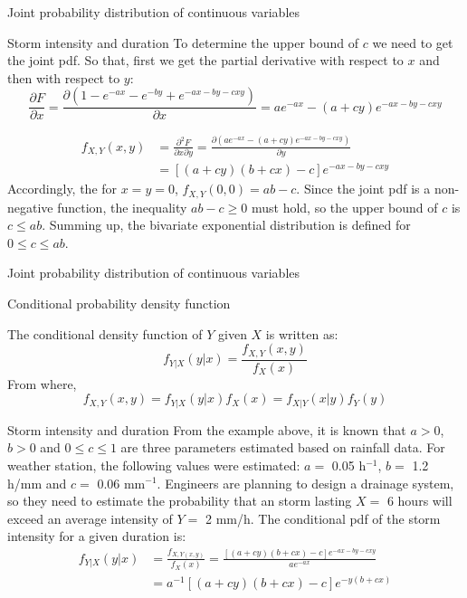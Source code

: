 \documentclass[8pt]{beamer}
\renewcommand{\emph}[1]{\textcolor{myorange}{#1}}
\begin{document}
\begin{frame}{Joint probability distribution of continuous variables}
    \begin{exampleblock}{Storm intensity and duration}
To determine the upper bound of $c$ we need to get the joint \emph{pdf}. So that, first we get the partial derivative with respect to $x$ and then with respect to $y$: 
\[
    \frac{\partial F}{\partial x} = \frac{\partial \left(1-e^{-ax}-e^{-by}+e^{-ax-by-cxy} \right)}{\partial x} = a e^{-ax} - (a + cy)e^{-ax-by-cxy}
\]

        \begin{align*}
            f_{X,Y}(x,y) &= \frac{\partial^2 F}{\partial x \partial y} = \frac{\partial \left( a e^{-ax} - (a + cy)e^{-ax-by-cxy}\right)}{\partial y} \\
                         &= \left[ (a+cy)(b+cx)-c \right]e^{-ax-by-cxy}
        \end{align*}
        Accordingly, the for $x=y=0$, $f_{X,Y}(0,0)= ab-c$. Since the joint \emph{pdf} is a non-negative function, the inequality $ab-c \geq 0$ must hold, so the upper bound of $c$ is $c\leq ab$. Summing up, the bivariate exponential distribution is defined for $0 \leq c \leq ab$. 
    \end{exampleblock}
\end{frame}

\begin{frame}{Joint probability distribution of continuous variables}
    \begin{block}{Conditional probability density function}

        The \alert{conditional density function} of $Y$ given $X$ is written as:
        \[
        f_{Y | X} (y|x) = \frac{f_{X,Y} (x,y)}{f_X (x)}
    \]
    From where,
        \[
         f_{X,Y} (x,y)=f_{Y | X} (y|x) f_X (x) = f_{X | Y} (x|y) f_Y (y)
    \]

    \end{block}
    \begin{exampleblock}{Storm intensity and duration}
        From the example above, it is known that $a>0$, $b>0$ and $0\leq c \leq 1$ are three parameters estimated based on rainfall data. For weather station, the following values were estimated: $a =$ 0.05 h$^{-1}$, $b =$ 1.2 h/mm and $c = $ 0.06 mm$^{-1}$. Engineers are planning to design a drainage system, so they need to estimate the probability that an storm lasting $X =$ 6 hours will exceed an average intensity of $Y = $ 2 mm/h.
        The conditional \emph{pdf} of the storm intensity for a given duration is:
        \begin{align*}
            f_{Y|X} (y|x) &= \frac{f_{X,Y (x,y)}}{f_X(x)} = \frac{\left[ (a+cy)(b+cx)-c \right]e^{-ax-by-cxy}}{a e^{-ax}} \\
                          &= a^{-1}\left[ (a+cy)(b+cx)-c \right]e^{-y(b+cx)}
        \end{align*}

    \end{exampleblock}
\end{frame}
\end{document}
